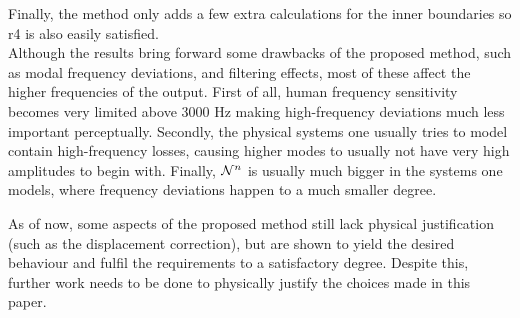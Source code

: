 Finally, the method only adds a few extra calculations for the inner boundaries so r4 is also easily satisfied. 
\\

Although the results bring forward some drawbacks of the proposed method, such as modal frequency deviations, and filtering effects, most of these affect the higher frequencies of the output. First of all, human frequency sensitivity becomes very limited above 3000 Hz \cite{Zwicker1990} making high-frequency deviations much less important perceptually. Secondly, the physical systems one usually tries to model contain high-frequency losses, causing higher modes to usually not have very high amplitudes to begin with. Finally, $\mathcal{N}^n$ is usually much bigger in the systems one models, where frequency deviations happen to a much smaller degree. 

As of now, some aspects of the proposed method still lack physical justification (such as the displacement correction), but are shown to yield the desired behaviour and fulfil the requirements to a satisfactory degree. Despite this, further work needs to be done to physically justify the choices made in this paper.

